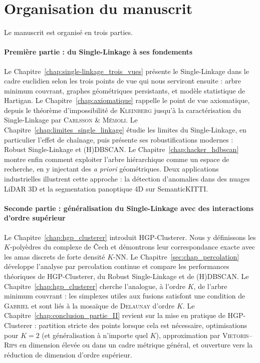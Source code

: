 \section{Organisation du manuscrit}

Le manuscrit est organisé en trois parties.

\paragraph{Première partie : du Single-Linkage à ses fondements}
Le Chapitre~\ref{chap:single-linkage_trois_vues} présente le Single-Linkage dans le cadre euclidien selon les trois points de vue qui nous serviront ensuite : arbre minimum couvrant, graphes géométriques persistants, et modèle statistique de Hartigan. 
Le Chapitre~\ref{chap:axiomatique} rappelle le point de vue axiomatique, depuis le théorème d'impossibilité de
\textsc{Kleinberg} jusqu'à la caractérisation du Single-Linkage par \textsc{Carlsson \& Mémoli}.
Le Chapitre~\ref{chap:limites_single_linkage} étudie les limites du Single-Linkage, en particulier l'effet de chaînage, puis présente ses robustifications modernes : Robust Single-Linkage et (H)DBSCAN. 
Le Chapitre~\ref{chap:hacker_hdbscan} montre enfin comment exploiter l'arbre hiérarchique comme un espace de recherche, en y injectant des \emph{a priori} géométriques. 
Deux applications industrielles illustrent cette approche : la détection d'anomalies dans des nuages LiDAR 3D et la segmentation panoptique 4D sur SemanticKITTI.

\paragraph{Seconde partie : généralisation du Single-Linkage avec des interactions d'ordre supérieur}
Le Chapitre~\ref{chap:hgp_clusterer} introduit HGP-Clusterer. Nous y définissons les $K$-polyèdres du complexe de \v{C}ech et démontrons leur correspondance exacte avec les amas discrets de forte densité $K$-NN. 
Le Chapitre~\ref{sec:chap_percolation} développe l'analyse par percolation continue et compare les performances théoriques de HGP-Clusterer, du Robust Single-Linkage et de (H)DBSCAN. 
Le Chapitre~\ref{chap:hgp_clusterer} cherche l'analogue, à l'ordre $K$, de l'arbre minimum couvrant : les simplexes utiles aux fusions satisfont une condition de \textsc{Gabriel} et sont liés à la mosaïque de \textsc{Delaunay} d'ordre $K$. 
Le Chapitre~\ref{chap:conclusion_partie_II} revient sur la mise en pratique de HGP-Clusterer : partition stricte des points lorsque cela est nécessaire, optimisations pour $K=2$ (et généralisation à n'importe quel $K$), approximation par \textsc{Vietoris--Rips} en dimension élevée ou dans un cadre métrique général, et ouverture vers la réduction de dimension d'ordre supérieur.

